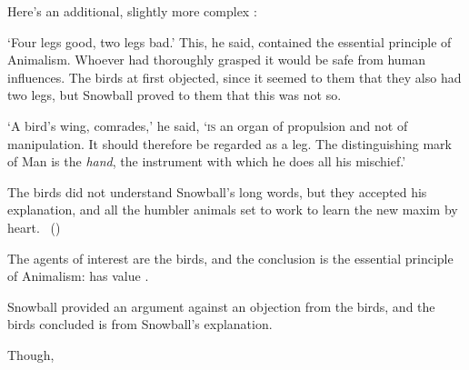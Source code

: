 \begin{note}
  Here's an additional, slightly more complex :

  \begin{scenario}[Animalism]%
    \label{scen:animalism}%
    `Four legs good, two legs bad.'
    This, he said, contained the essential principle of Animalism.
    Whoever had thoroughly grasped it would be safe from human influences.
    The birds at first objected, since it seemed to them that they also had two legs, but Snowball proved to them that this was not so.

    `A bird's wing, comrades,' he said, `\textsc{is} an organ of propulsion and not of manipulation.
    It should therefore be regarded as a leg.
    The distinguishing mark of Man is the \emph{hand}, the instrument with which he does all his mischief.'

    The birds did not understand Snowball's long words, but they accepted his explanation, and all the humbler animals set to work to learn the new maxim by heart.\newline
    \mbox{ }\hfill\mbox{(\cite[25]{Orwell:1976aa})}%
    \newline
  \end{scenario}

  \noindent%
  The agents of interest are the birds, and the conclusion is the essential principle of Animalism:
   has value .

  Snowball provided an argument against an objection from the birds, and the birds concluded  is  from Snowball's explanation.

  Though, 
  

\end{note}


